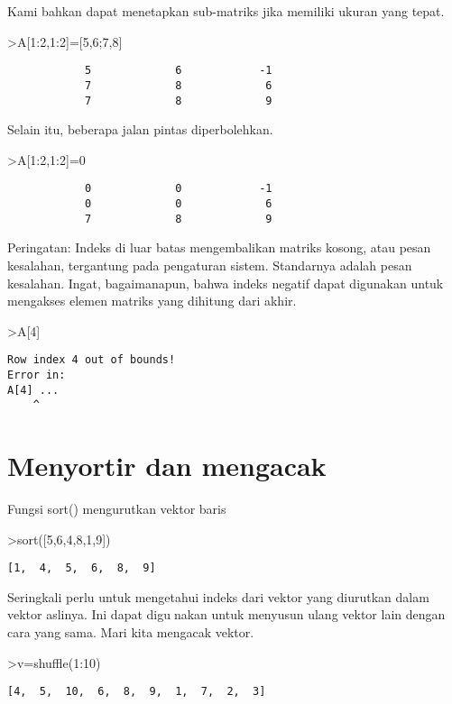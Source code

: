 \documentclass[
]{book}
\begin{document}
Kami bahkan dapat menetapkan sub-matriks jika memiliki ukuran yang tepat.

\textgreater A{[}1:2,1:2{]}={[}5,6;7,8{]}

\begin{verbatim}
            5             6            -1 
            7             8             6 
            7             8             9 
\end{verbatim}

Selain itu, beberapa jalan pintas diperbolehkan.

\textgreater A{[}1:2,1:2{]}=0

\begin{verbatim}
            0             0            -1 
            0             0             6 
            7             8             9 
\end{verbatim}

Peringatan: Indeks di luar batas mengembalikan matriks kosong, atau pesan kesalahan, tergantung pada pengaturan sistem. Standarnya adalah pesan kesalahan. Ingat, bagaimanapun, bahwa indeks negatif dapat digunakan untuk mengakses elemen matriks yang dihitung dari akhir.

\textgreater A{[}4{]}

\begin{verbatim}
Row index 4 out of bounds!
Error in:
A[4] ...
    ^
\end{verbatim}

\section{Menyortir dan mengacak}\label{menyortir-dan-mengacak}

Fungsi sort() mengurutkan vektor baris

\textgreater sort({[}5,6,4,8,1,9{]})

\begin{verbatim}
[1,  4,  5,  6,  8,  9]
\end{verbatim}

Seringkali perlu untuk mengetahui indeks dari vektor yang diurutkan dalam vektor aslinya. Ini dapat digunakan untuk menyusun ulang vektor lain dengan cara yang sama. Mari kita mengacak vektor.

\textgreater v=shuffle(1:10)

\begin{verbatim}
[4,  5,  10,  6,  8,  9,  1,  7,  2,  3]
\end{verbatim}
\end{document}
